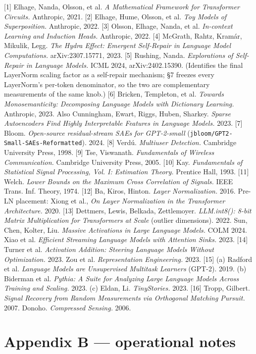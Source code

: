\documentclass[10pt]{article}
\begin{document}
[1] Elhage, Nanda, Olsson, et al. \emph{A Mathematical Framework for Transformer Circuits.} Anthropic, 2021.
[2] Elhage, Hume, Olsson, et al. \emph{Toy Models of Superposition.} Anthropic, 2022.
[3] Olsson, Elhage, Nanda, et al. \emph{In-context Learning and Induction Heads.} Anthropic, 2022.
[4] McGrath, Rahtz, Kramár, Mikulik, Legg. \emph{The Hydra Effect: Emergent Self-Repair in Language Model Computations.} arXiv:2307.15771, 2023.
[5] Rushing, Nanda. \emph{Explorations of Self-Repair in Language Models.} ICML 2024, arXiv:2402.15390. (Identifies the final LayerNorm scaling factor as a self-repair mechanism; §7 freezes every LayerNorm's per-token denominator, so the two are complementary measurements of the same knob.)
[6] Bricken, Templeton, et al. \emph{Towards Monosemanticity: Decomposing Language Models with Dictionary Learning.} Anthropic, 2023. Also Cunningham, Ewart, Riggs, Huben, Sharkey. \emph{Sparse Autoencoders Find Highly Interpretable Features in Language Models.} 2023.
[7] Bloom. \emph{Open-source residual-stream SAEs for GPT-2-small} (\texttt{jbloom/GPT2-Small-SAEs-Reformatted}). 2024.
[8] Verdú. \emph{Multiuser Detection.} Cambridge University Press, 1998.
[9] Tse, Viswanath. \emph{Fundamentals of Wireless Communication.} Cambridge University Press, 2005.
[10] Kay. \emph{Fundamentals of Statistical Signal Processing, Vol. I: Estimation Theory.} Prentice Hall, 1993.
[11] Welch. \emph{Lower Bounds on the Maximum Cross Correlation of Signals.} IEEE Trans. Inf. Theory, 1974.
[12] Ba, Kiros, Hinton. \emph{Layer Normalization.} 2016. Pre-LN placement: Xiong et al., \emph{On Layer Normalization in the Transformer Architecture.} 2020.
[13] Dettmers, Lewis, Belkada, Zettlemoyer. \emph{LLM.int8(): 8-bit Matrix Multiplication for Transformers at Scale} (outlier dimensions). 2022. Sun, Chen, Kolter, Liu. \emph{Massive Activations in Large Language Models.} COLM 2024. Xiao et al. \emph{Efficient Streaming Language Models with Attention Sinks.} 2023.
[14] Turner et al. \emph{Activation Addition: Steering Language Models Without Optimization.} 2023. Zou et al. \emph{Representation Engineering.} 2023.
[15] (a) Radford et al. \emph{Language Models are Unsupervised Multitask Learners} (GPT-2). 2019. (b) Biderman et al. \emph{Pythia: A Suite for Analyzing Large Language Models Across Training and Scaling.} 2023. (c) Eldan, Li. \emph{TinyStories.} 2023.
[16] Tropp, Gilbert. \emph{Signal Recovery from Random Measurements via Orthogonal Matching Pursuit.} 2007. Donoho. \emph{Compressed Sensing.} 2006.

\section{Appendix B --- operational notes}
\end{document}

